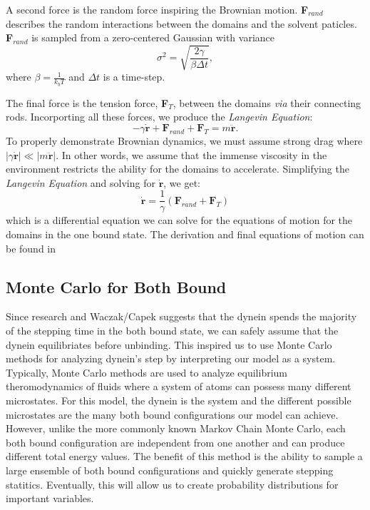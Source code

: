 A second force is the random force inspiring the Brownian motion. \textbf{F}$_{rand}$ describes the random interactions between the domains and the solvent paticles. \textbf{F}$_{rand}$ is sampled from a zero-centered Gaussian with variance
\begin{equation}
	\sigma^2=\sqrt{\frac{2\gamma}{\beta\Delta t}},
\end{equation}
where $\beta=\frac{1}{k_bT}$  and $\Delta t$ is a time-step. 

The final force is the tension force, \textbf{F}$_T$, between the domains \textit{via} their connecting rods. Incorporting all these forces, we produce the \textit{Langevin Equation}:
\begin{equation}
	-\gamma \dot{\textbf{r}} + \textbf{F}_{rand} + \textbf{F}_T = m\ddot{\textbf{r}}.
\end{equation}
To properly demonstrate Brownian dynamics, we must assume strong drag where $|\gamma \dot{\textbf{r}}|\ll |m\ddot{\textbf{r}}|$. In other words, we assume that the immense viscosity in the environment restricts the ability for the domains to accelerate. Simplifying the \textit{Langevin Equation} and solving for $\dot{\textbf{r}}$, we get:
\begin{equation}
	\dot{\textbf{r}}=\frac{1}{\gamma}(\textbf{F}_{rand} + \textbf{F}_T)
\end{equation}
which is a differential equation we can solve for the equations of motion for the domains in the one bound state. The derivation and final equations of motion can be found in \cite{Capek2017, W}


\subsection{Monte Carlo for Both Bound}
Since research and Waczak/Capek suggests that the dynein spends the majority of the stepping time in the both bound state, we can safely assume that the dynein equilibriates before unbinding. This inspired us to use Monte Carlo methods for analyzing dynein's step by interpreting our model as a system. Typically, Monte Carlo methods are used to analyze equilibrium theromodynamics of fluids where a system of atoms can possess many different microstates. For this model, the dynein is the system and the different possible microstates are the many both bound configurations our model can achieve. However, unlike the more commonly known Markov Chain Monte Carlo, each both bound configuration are independent from one another and can produce different total energy values. The benefit of this method is the ability to sample a large ensemble of both bound configurations and quickly generate stepping statitics. Eventually, this will allow us to create probability distributions for important variables.

